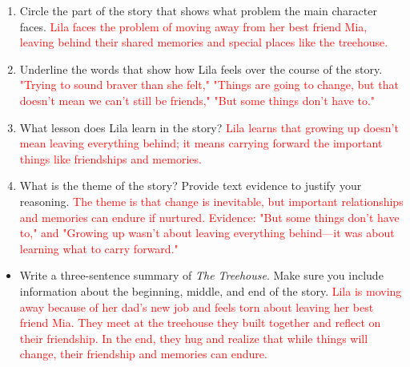 \documentclass[12pt]{article}
\begin{document}
\begin{tcolorbox}[colframe=black!60, colback=white, 
coltitle=black, colbacktitle=black!15, fonttitle=\bfseries\Large, 
title=Independent Practice, halign title=center, left=10pt, right=10pt, top=10pt, bottom=15pt]

\begin{enumerate}[itemsep=1em]
    \item Circle the part of the story that shows what problem the main character faces.
    \textcolor{red}{Lila faces the problem of moving away from her best friend Mia, leaving behind their shared memories and special places like the treehouse.}
    \item Underline the words that show how Lila feels over the course of the story.
    \textcolor{red}{"Trying to sound braver than she felt," "Things are going to change, but that doesn’t mean we can’t still be friends," "But some things don’t have to."}
    \item What lesson does Lila learn in the story? 
    \textcolor{red}{Lila learns that growing up doesn’t mean leaving everything behind; it means carrying forward the important things like friendships and memories.}
    \item What is the theme of the story? Provide text evidence to justify your reasoning.
    \textcolor{red}{The theme is that change is inevitable, but important relationships and memories can endure if nurtured. Evidence: "But some things don’t have to," and "Growing up wasn’t about leaving everything behind—it was about learning what to carry forward."}
\end{enumerate}
\end{tcolorbox}

\begin{tcolorbox}[colframe=black!60, colback=white, 
coltitle=black, colbacktitle=black!15, fonttitle=\bfseries\Large, 
title=Exit Ticket, halign title=center, left=10pt, right=10pt, top=10pt, bottom=15pt]
\textbf{}
\begin{itemize}
    \item Write a three-sentence summary of \textit{The Treehouse}. Make sure you include information about the beginning, middle, and end of the story.
    \textcolor{red}{Lila is moving away because of her dad’s new job and feels torn about leaving her best friend Mia. They meet at the treehouse they built together and reflect on their friendship. In the end, they hug and realize that while things will change, their friendship and memories can endure.}
\end{itemize}
\end{tcolorbox}
\end{document}
